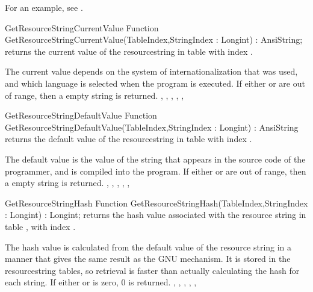 \documentclass{report}
\begin{document}
For an example, see .

\begin{function}{GetResourceStringCurrentValue}
\Declaration
Function GetResourceStringCurrentValue(TableIndex,StringIndex : Longint) : AnsiString;
\Description
{} returns the current value of the 
resourcestring in table  with index .

The current value depends on the system of internationalization that was
used, and which language is selected when the program is executed.
\Errors
If either  or  are out of range, then
a empty string is returned.
\SeeAlso
{},
,
,
,
,
\end{function}  


\begin{function}{GetResourceStringDefaultValue}
\Declaration
Function GetResourceStringDefaultValue(TableIndex,StringIndex : Longint) : AnsiString
\Description
{} returns the default value of the 
resourcestring in table  with index .

The default value is the value of the string that appears in the source code
of the programmer, and is compiled into the program.
\Errors
If either  or  are out of range, then
a empty string is returned.
\Errors
\SeeAlso
{},
,
,
,
,
\end{function}


\begin{function}{GetResourceStringHash}
\Declaration
Function GetResourceStringHash(TableIndex,StringIndex : Longint) : Longint;
\Description
{} returns the hash value associated with the
resource string in table , with index .

The hash value is calculated from the default value of the resource string
in a manner that gives the same result as the GNU  mechanism.
It is stored in the resourcestring tables, so retrieval is faster than
actually calculating the hash for each string.
\Errors
If either  or  is zero, 0 is returned.
\SeeAlso
{}
,
,
,
,
,
\end{function}
\end{document}
